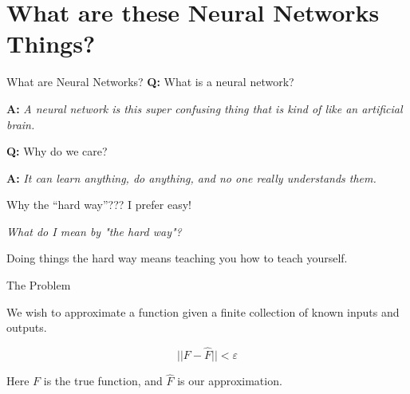 \documentclass[11pt]{beamer}
\let\epsilon=\varepsilon
\begin{document}
\section{What are these Neural Networks Things?}

\begin{frame}{What are Neural Networks?}
\textbf{Q:} What is a neural network?

\bigskip 

\textbf{A:} \emph{A neural network is this super confusing thing that is kind of like an artificial brain.}

\bigskip 

\textbf{Q:} Why do we care?

\bigskip 

\textbf{A:} \emph{It can learn anything, do anything, and no one really understands them.}
\end{frame}

\begin{frame}{Why the ``hard way''??? I prefer easy!}

\emph{What do I mean by "the hard way"?}

\bigskip

\bigskip

Doing things the hard way means teaching you how to teach yourself.

\end{frame}

\begin{frame}{The Problem}

We wish to approximate a function given a finite collection of known inputs and outputs.

\bigskip

$$||F - \widehat{F}|| < \epsilon$$

\bigskip

Here $F$ is the true function, and $\widehat{F}$ is our approximation.
\end{frame}
\end{document}
